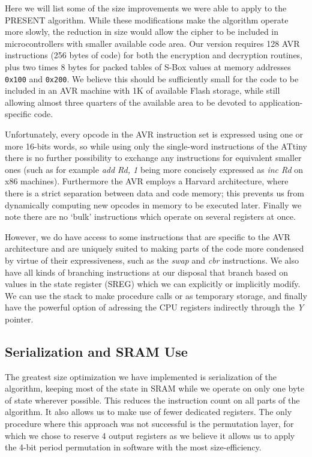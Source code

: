 \documentclass[11pt]{llncs2e} %
\begin{document}
Here we will list some of the size improvements we were able to apply to the PRESENT algorithm.
While these modifications make the algorithm operate more slowly, the reduction in size would allow the cipher to be included in microcontrollers with smaller available code area.
Our version requires 128 AVR instructions (256 bytes of code) for both the encryption and decryption routines, plus two times 8 bytes for packed tables of S-Box values at memory addresses \texttt{0x100} and \texttt{0x200}.
We believe this should be sufficiently small for the code to be included in an AVR machine with 1K of available Flash storage, while still allowing almost three quarters of the available area to be devoted to application-specific code.

Unfortunately, every opcode in the AVR instruction set is expressed using one or more 16-bits words, so while using only the single-word instructions of the ATtiny there is no further possibility to exchange any instructions for equivalent smaller ones (such as for example \textit{add Rd, 1} being more concisely expressed as \textit{inc Rd} on x86 machines).
Furthermore the AVR employs a Harvard architecture, where there is a strict separation between data and code memory; this prevents us from dynamically computing new opcodes in memory to be executed later.
Finally we note there are no `bulk' instructions which operate on several registers at once.

However, we do have access to some instructions that are specific to the AVR architecture and are uniquely suited to making parts of the code more condensed by virtue of their expressiveness, such as the \textit{swap} and \textit{cbr} instructions.
We also have all kinds of branching instructions at our disposal that branch based on values in the state register (SREG) which we can explicitly or implicitly modify.
We can use the stack to make procedure calls or as temporary storage, and finally have the powerful option of adressing the CPU registers indirectly through the \textit{Y} pointer.

\subsection{Serialization and SRAM Use}
The greatest size optimization we have implemented is serialization of the algorithm, keeping most of the state in SRAM while we operate on only one byte of state wherever possible.
This reduces the instruction count on all parts of the algorithm.
It also allows us to make use of fewer dedicated registers. %
The only procedure where this approach was not successful is the permutation layer, for which we chose to reserve 4 output registers as we believe it allows us to apply the 4-bit period permutation in software with the most size-efficiency.
\end{document}
